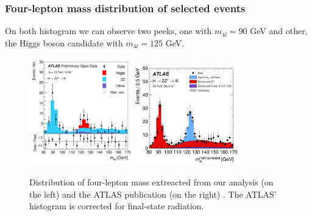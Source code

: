 \documentclass[aspectratio=1610, english]{beamer}
\begin{document}
\begin{frame}
\frametitle{Four-lepton mass distribution of selected events}

On both histogram we can observe two peeks, one with $m_{4l} = 90 $ GeV and other, the Higgs boson candidate with $m_{4l} = 125 $ GeV.

\begin{figure} [H]
\centering
\includegraphics[width=0.4\textwidth]{mass_four_lep.png}
\includegraphics[width=0.4\textwidth]{mass_four_lep_pub.png}
\caption{ Distribution of four-lepton mass extreacted from our analysis (on the left) and the ATLAS publication (on the right) \cite{hzz}. The ATLAS' histogram is corrected for final-state radiation.}
\end{figure}

\end{frame}
\end{document}
